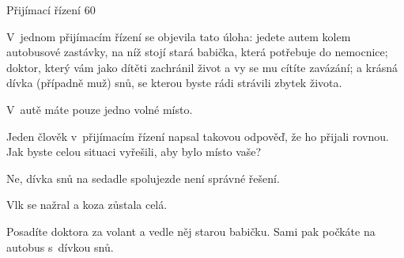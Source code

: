 Přijímací řízení
60 %

V~jednom přijímacím řízení se objevila tato úloha: jedete autem kolem autobusové zastávky, na níž stojí stará babička, která potřebuje do nemocnice; doktor, který vám jako dítěti zachránil život a vy se mu cítíte zavázání; a krásná dívka (případně muž) snů, se kterou byste rádi strávili zbytek života.

V~autě máte pouze jedno volné místo.

Jeden člověk v~přijímacím řízení napsal takovou odpověď, že ho přijali rovnou. Jak byste celou situaci vyřešili, aby bylo místo vaše?

Ne, dívka snů na sedadle spolujezde není správné řešení.

Vlk se nažral a koza zůstala celá.

Posadíte doktora za volant a vedle něj starou babičku. Sami pak počkáte na autobus s~dívkou snů.
